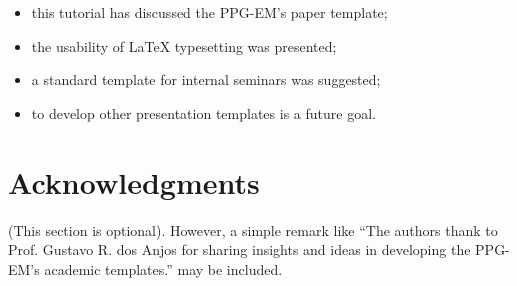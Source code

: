 \documentclass[date]{ppgem}
\begin{document}
\begin{multicols}{2}
\begin{itemize}
 \item this tutorial has discussed the PPG-EM's paper template;
 \item the usability of {\LaTeX} typesetting was presented;
 \item a standard template for internal seminars was suggested;
 \item to develop other presentation templates is a future goal. 
\end{itemize}

\section{Acknowledgments}

(This section is optional). However, a simple remark like ``The authors
thank to Prof. Gustavo R. dos Anjos for sharing insights and ideas in
developing the PPG-EM's academic templates.'' may be included. 




\end{multicols}
\end{document}
